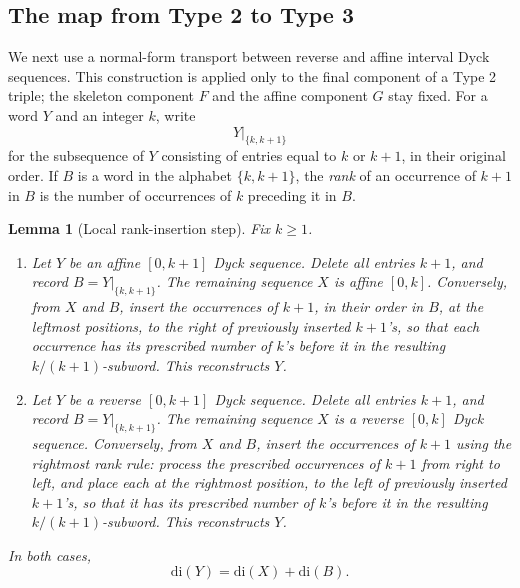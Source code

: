 \documentclass[11pt]{article}
\theoremstyle{plain}
\newtheorem{lemma}[theorem]{Lemma}
\theoremstyle{definition}
\theoremstyle{remark}
\newcommand{\di}{\mathrm{di}}
\begin{document}
\subsection{The map from Type 2 to Type 3}
We next use a normal-form transport between reverse and affine interval Dyck
sequences.  This construction is applied only to the final component of a
Type 2 triple; the skeleton component \(F\) and the affine component \(G\) stay
fixed.
For a word \(Y\) and an integer \(k\), write
\[
  Y|_{\{k,k+1\}}
\]
for the subsequence of \(Y\) consisting of entries equal to \(k\) or
\(k+1\), in their original order.  If \(B\) is a word in the alphabet
\(\{k,k+1\}\), the \emph{rank} of an occurrence of \(k+1\) in \(B\) is the
number of occurrences of \(k\) preceding it in \(B\).
\begin{lemma}[Local rank-insertion step]
\label{lem:local-rank-insertion}
Fix \(k\ge 1\).
\begin{enumerate}[label=\textup{(\alph*)}]
\item Let \(Y\) be an affine \([0,k+1]\) Dyck sequence.  Delete all entries
\(k+1\), and record \(B=Y|_{\{k,k+1\}}\).  The remaining sequence \(X\) is
affine \([0,k]\).  Conversely, from \(X\) and \(B\), insert the occurrences
of \(k+1\), in their order in \(B\), at the leftmost positions, to the right
of previously inserted \(k+1\)'s, so that each occurrence has its prescribed
number of \(k\)'s before it in the resulting \(k/(k+1)\)-subword.  This
reconstructs \(Y\).
\item Let \(Y\) be a reverse \([0,k+1]\) Dyck sequence.  Delete all entries
\(k+1\), and record \(B=Y|_{\{k,k+1\}}\).  The remaining sequence \(X\) is a
reverse \([0,k]\) Dyck sequence.  Conversely, from \(X\) and \(B\), insert the
occurrences of \(k+1\) using the rightmost rank rule: process the prescribed
occurrences of \(k+1\) from right to left, and place each at the rightmost
position, to the left of previously inserted \(k+1\)'s, so that it has its
prescribed number of \(k\)'s before it in the resulting \(k/(k+1)\)-subword.
This reconstructs \(Y\).
\end{enumerate}
In both cases,
\[
  \di(Y)=\di(X)+\di(B).
\]
\end{lemma}
\end{document}
